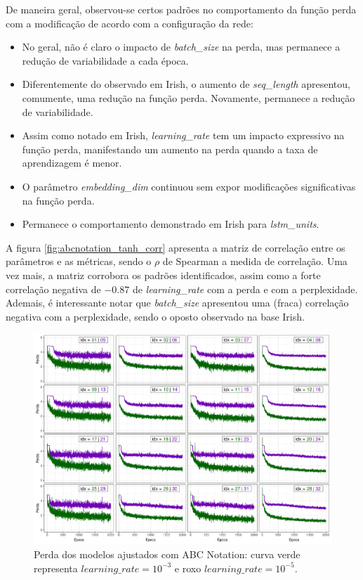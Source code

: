 \documentclass{automatextcc}
\begin{document}
De maneira geral, observou-se certos padrões no comportamento da função perda com a modificação de acordo com a configuração da rede:
\begin{itemize}
    \item No geral, não é claro o impacto de \textit{batch\_size} na perda, mas permanece a redução de variabilidade a cada época.
    \item Diferentemente do observado em Irish, o aumento de \textit{seq\_length} apresentou, comumente, uma redução na função perda. Novamente, permanece a redução de variabilidade.
    \item Assim como notado em Irish, \textit{learning\_rate} tem um impacto expressivo na função perda, manifestando um aumento na perda quando a taxa de aprendizagem é menor. 
    \item O parâmetro \textit{embedding\_dim} continuou sem expor modificações significativas na função perda.
    \item Permanece o comportamento demonstrado em Irish para \textit{lstm\_units}. 
\end{itemize}
A figura \ref{fig:abcnotation_tanh_corr} apresenta a matriz de correlação entre os parâmetros e as métricas, sendo o $\rho$ de Spearman a medida de correlação. Uma vez mais, a matriz corrobora os padrões identificados, assim como a forte correlação negativa de $-0.87$ de \textit{learning\_rate} com a perda e com a perplexidade. Ademais, é interessante notar que \textit{batch\_size} apresentou uma (fraca) correlação negativa com a perplexidade, sendo o oposto observado na base Irish.

\begin{figure}[!ht]
    \centering
    \includegraphics[width=\textwidth]{abcnotation_tanh_loss.pdf}
    \caption{Perda dos modelos ajustados com ABC Notation: curva verde representa $learning\_rate = 10^{-3}$ e roxo $learning\_rate = 10^{-5}$.}
    \label{fig:abcnotation_tanh_loss}
\end{figure}
\end{document}
